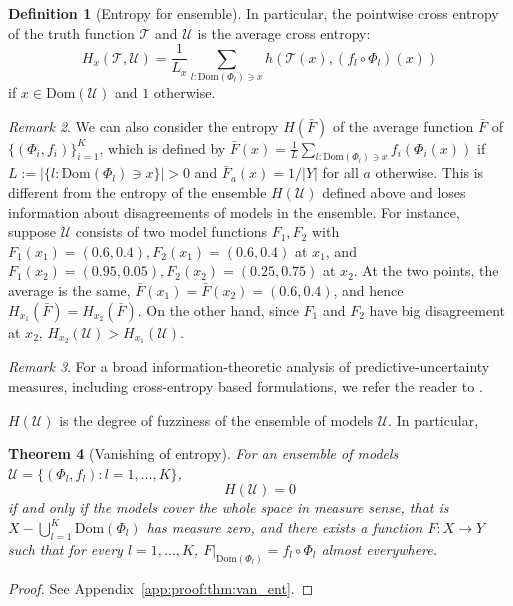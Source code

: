 \documentclass{article}
\theoremstyle{plain}
\newtheorem{theorem}{Theorem}[section]
\theoremstyle{definition}
\newtheorem{definition}[theorem]{Definition}
\theoremstyle{remark}
\newtheorem{remark}[theorem]{Remark}
\newcommand{\cT}{\mathcal{T}}
\newcommand{\cU}{\mathcal{U}}
\newcommand{\Dom}{\mathrm{Dom}}
\begin{document}
\begin{definition}[Entropy for ensemble]
In particular, the pointwise cross entropy of the truth function $\cT$ and $\cU$ is the average cross entropy:
\begin{equation} \label{eq:H_x(T,U)}
	H_x(\cT,\cU) = \frac{1}{L_{x}} \sum_{l: \Dom(\Phi_l)\ni x} h(\cT(x),(f_l\circ \Phi_{l})(x))
\end{equation}
if $x \in \Dom(\cU)$ and $1$ otherwise.
\end{definition}

\begin{remark} \label{rmk:entropy_average}
	We can also consider the entropy $H(\bar{F})$ of the average function $\bar{F}$ of $\{(\Phi_i,f_i)\}_{i=1}^K$, which is defined by $\bar{F}(x) = \frac{1}{L}\sum_{l: \Dom(\Phi_l) \ni x} f_i(\Phi_i(x))$ if $L := |\{l: \Dom(\Phi_l) \ni x\}|>0$ and $\bar{F}_a(x) = 1/|Y|$ for all $a$ otherwise. This is different from the entropy of the ensemble $H(\cU)$ defined above and loses information about disagreements of models in the ensemble. For instance, suppose $\cU$ consists of two model functions $F_1,F_2$ with $F_1(x_1)=(0.6,0.4), F_2(x_1) = (0.6,0.4)$ at $x_1$, and $F_1(x_2)=(0.95,0.05), F_2(x_2) = (0.25,0.75)$ at $x_2$. At the two points, the average is the same, $\bar{F}(x_1) = \bar{F}(x_2) = (0.6,0.4)$, and hence $H_{x_1}(\bar{F}) = H_{x_2}(\bar{F})$. On the other hand, since $F_1$ and $F_2$ have big disagreement at $x_2$, $H_{x_2}(\cU) > H_{x_1}(\cU)$.
\end{remark}

\begin{remark}
For a broad information-theoretic analysis of predictive-uncertainty measures, including cross-entropy based formulations, we refer the reader to \cite{schweighofer2025}.
\end{remark}

$H(\cU)$ is the degree of fuzziness of the ensemble of models $\cU$. In particular,
\begin{theorem}[Vanishing of entropy]\label{thm:van_ent}
For an ensemble of models $\cU = \{(\Phi_l,f_l): l=1,\ldots,K\}$, 
$$H(\cU)=0$$ 
if and only if the models cover the whole space in measure sense, that is $X - \bigcup_{l=1}^K \Dom(\Phi_l)$ has measure zero, and there exists a function $F: X \to Y$ such that for every $l = 1,\ldots,K$, $F|_{\Dom(\Phi_l)} = f_l \circ \Phi_l$ almost everywhere. 
\end{theorem}

\begin{proof}
	See Appendix~\ref{app:proof:thm:van_ent}.
\end{proof}
\end{document}
